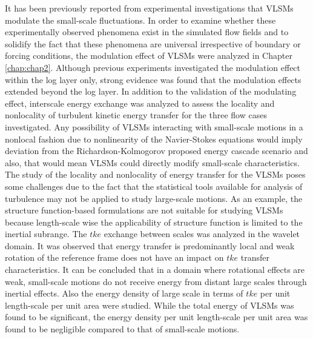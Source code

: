 It has been previously reported from experimental investigations that VLSMs modulate the small-scale fluctuations. In order to examine whether these experimentally observed phenomena exist in the simulated flow fields and to solidify the fact that these phenomena are universal irrespective of boundary or forcing conditions, the modulation effect of VLSMs were analyzed in Chapter \ref{chap:chap2}. Although previous experiments investigated the modulation effect within the log layer only, strong evidence was found that the modulation effects extended beyond the log layer. In addition to the validation of the modulating effect, interscale energy exchange was analyzed to assess the locality and nonlocality of turbulent kinetic energy transfer for the three flow cases investigated. Any possibility of VLSMs interacting with small-scale motions in a nonlocal fashion due to nonlinearity of the Navier-Stokes equations would imply deviation from the Richardson-Kolmogorov proposed energy cascade scenario and also, that would mean VLSMs could directly modify small-scale characteristics. The study of the locality and nonlocality of energy transfer for the VLSMs poses some challenges due to the fact that the statistical tools available for analysis of turbulence may not be applied to study large-scale motions. As an example, the structure function-based formulations are not suitable for studying VLSMs because length-scale wise the applicability of structure function is limited to the inertial subrange. The $tke$ exchange between scales was analyzed in the wavelet domain. It was observed that energy transfer is predominantly local and weak rotation of the reference frame does not have an impact on $tke$ transfer characteristics. It can be concluded that in a domain where rotational effects are weak, small-scale motions do not receive energy from distant large scales through inertial effects. Also the energy density of large scale in terms of $tke$ per unit length-scale per unit area were studied. While the total energy of VLSMs was found to be significant, the energy density per unit length-scale per unit area was found to be negligible compared to that of small-scale motions. 

